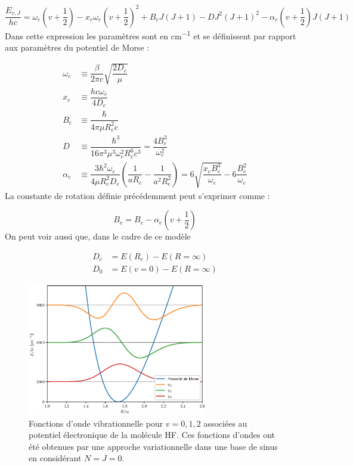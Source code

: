 \[ 
    \dfrac{E_{v,J}}{hc} = \omega_e\left(v+\dfrac{1}{2}\right)-x_e\omega_e\left(v+\dfrac{1}{2}\right)^2+B_eJ(J+1)-DJ^2(J+1)^2-\alpha_e\left(v+\dfrac{1}{2}\right)J(J+1)
\]
Dans cette expression les paramètres sont en \si{cm^{-1}} et se définissent par rapport
aux paramètres du potentiel de Morse :

\begingroup
\allowdisplaybreaks
\begin{align*}
    \omega_e &\equiv \dfrac{\beta}{2\pi c}\sqrt{\dfrac{2D_e}{\mu}}\\
    x_e &\equiv \dfrac{hc\omega_e}{4D_e}\\
    B_e &\equiv \dfrac{\hbar}{4\pi\mu R_e^2c}\\
    D &\equiv \dfrac{\hbar^3}{16\pi^3\mu^3\omega_e^2R_e^6c^3} = \dfrac{4B_e^3}{\omega_e^2}\\
    \alpha_e &\equiv \dfrac{3\hbar^2\omega_e}{4\mu R_e^2D_e}\left(\dfrac{1}{aR_e}-\dfrac{1}{a^2R_e^2}\right) = 6\sqrt{\dfrac{x_eB_e^3}{\omega_e}}-6\dfrac{B_e^2}{\omega_e}
\end{align*}
\endgroup
La constante de rotation définie précédemment peut s'exprimer comme :

\[ B_v = B_e -\alpha_e(v+\dfrac{1}{2}) \]
On peut voir aussi que, dans le cadre de ce modèle

\begin{align*}
    D_e &= E(R_e)-E(R=\infty)\\
    D_0 &= E(v=0)-E(R=\infty)
\end{align*}

\begin{figure}[htpb]
    \centering
    \includegraphics[width=0.7\textwidth]{Images3/niv_energie_morse.eps}
    \caption{Fonctions d’onde vibrationnelle pour $v= 0, 1, 2$ associées au potentiel
    électronique de la molécule HF. Ces fonctions d’ondes ont été obtenues par une
    approche variationnelle dans une base de sinus en considérant $N = J = 0$.}
    \label{fig:Niv}
\end{figure}


